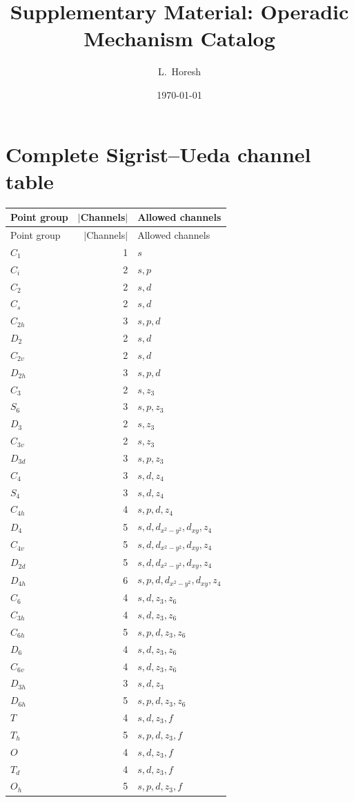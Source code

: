 \documentclass[11pt,a4paper]{article}
\title{Supplementary Material: Operadic Mechanism Catalog}
\author{L.\ Horesh}
\date{\today}
\begin{document}
\maketitle

\section{Complete Sigrist--Ueda channel table}\label{sec:channels}

\begin{longtable}{lrl}
\toprule
Point group & $|$Channels$|$ & Allowed channels \\
\midrule
\endfirsthead
\toprule
Point group & $|$Channels$|$ & Allowed channels \\
\midrule
\endhead
$C_1$   & 1 & $s$ \\
$C_i$   & 2 & $s, p$ \\
$C_2$   & 2 & $s, d$ \\
$C_s$   & 2 & $s, d$ \\
$C_{2h}$ & 3 & $s, p, d$ \\
$D_2$   & 2 & $s, d$ \\
$C_{2v}$ & 2 & $s, d$ \\
$D_{2h}$ & 3 & $s, p, d$ \\
$C_3$   & 2 & $s, z_3$ \\
$S_6$   & 3 & $s, p, z_3$ \\
$D_3$   & 2 & $s, z_3$ \\
$C_{3v}$ & 2 & $s, z_3$ \\
$D_{3d}$ & 3 & $s, p, z_3$ \\
$C_4$   & 3 & $s, d, z_4$ \\
$S_4$   & 3 & $s, d, z_4$ \\
$C_{4h}$ & 4 & $s, p, d, z_4$ \\
$D_4$   & 5 & $s, d, d_{x^2-y^2}, d_{xy}, z_4$ \\
$C_{4v}$ & 5 & $s, d, d_{x^2-y^2}, d_{xy}, z_4$ \\
$D_{2d}$ & 5 & $s, d, d_{x^2-y^2}, d_{xy}, z_4$ \\
$D_{4h}$ & 6 & $s, p, d, d_{x^2-y^2}, d_{xy}, z_4$ \\
$C_6$   & 4 & $s, d, z_3, z_6$ \\
$C_{3h}$ & 4 & $s, d, z_3, z_6$ \\
$C_{6h}$ & 5 & $s, p, d, z_3, z_6$ \\
$D_6$   & 4 & $s, d, z_3, z_6$ \\
$C_{6v}$ & 4 & $s, d, z_3, z_6$ \\
$D_{3h}$ & 3 & $s, d, z_3$ \\
$D_{6h}$ & 5 & $s, p, d, z_3, z_6$ \\
$T$     & 4 & $s, d, z_3, f$ \\
$T_h$   & 5 & $s, p, d, z_3, f$ \\
$O$     & 4 & $s, d, z_3, f$ \\
$T_d$   & 4 & $s, d, z_3, f$ \\
$O_h$   & 5 & $s, p, d, z_3, f$ \\
\bottomrule
\end{longtable}
\end{document}

